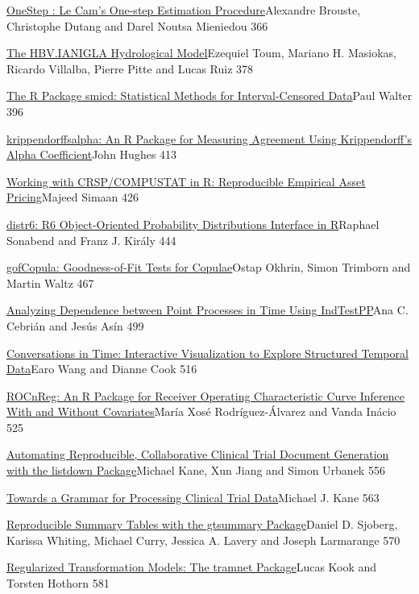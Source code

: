 \href{../../articles/RJ-2021-044}{OneStep : Le Cam's One-step Estimation
Procedure}Alexandre Brouste, Christophe Dutang and Darel Noutsa
Mieniedou 366

\href{../../articles/RJ-2021-059}{The HBV.IANIGLA Hydrological
Model}Ezequiel Toum, Mariano H. Masiokas, Ricardo Villalba, Pierre Pitte
and Lucas Ruiz 378

\href{../../articles/RJ-2021-045}{The R Package smicd: Statistical
Methods for Interval-Censored Data}Paul Walter 396

\href{../../articles/RJ-2021-046}{krippendorffsalpha: An R Package for
Measuring Agreement Using Krippendorff's Alpha Coefficient}John Hughes
413

\href{../../articles/RJ-2021-047}{Working with CRSP/COMPUSTAT in R:
Reproducible Empirical Asset Pricing}Majeed Simaan 426

\href{../../articles/RJ-2021-055}{distr6: R6 Object-Oriented Probability
Distributions Interface in R}Raphael Sonabend and Franz J. Király 444

\href{../../articles/RJ-2021-060}{gofCopula: Goodness-of-Fit Tests for
Copulae}Ostap Okhrin, Simon Trimborn and Martin Waltz 467

\href{../../articles/RJ-2021-049}{Analyzing Dependence between Point
Processes in Time Using IndTestPP}Ana C. Cebrián and Jesús Asín 499

\href{../../articles/RJ-2021-050}{Conversations in Time: Interactive
Visualization to Explore Structured Temporal Data}Earo Wang and Dianne
Cook 516

\href{../../articles/RJ-2021-066}{ROCnReg: An R Package for Receiver
Operating Characteristic Curve Inference With and Without
Covariates}María Xosé Rodríguez-Álvarez and Vanda Inácio 525

\href{../../articles/RJ-2021-051}{Automating Reproducible, Collaborative
Clinical Trial Document Generation with the listdown Package}Michael
Kane, Xun Jiang and Simon Urbanek 556

\href{../../articles/RJ-2021-052}{Towards a Grammar for Processing
Clinical Trial Data}Michael J. Kane 563

\href{../../articles/RJ-2021-053}{Reproducible Summary Tables with the
gtsummary Package}Daniel D. Sjoberg, Karissa Whiting, Michael Curry,
Jessica A. Lavery and Joseph Larmarange 570

\href{../../articles/RJ-2021-054}{Regularized Transformation Models: The
tramnet Package}Lucas Kook and Torsten Hothorn 581

